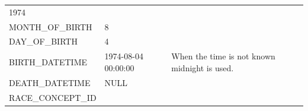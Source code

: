 \documentclass[10.5pt]{book}
\theoremstyle{definition}
\theoremstyle{definition}
\theoremstyle{definition}
\theoremstyle{remark}
\begin{document}
\begin{longtable}[]{@{}lll@{}}
\begin{minipage}[t]{0.16\columnwidth}
1974\strut
\end{minipage} & \begin{minipage}[t]{0.48\columnwidth}\raggedright\strut
\strut
\end{minipage}\tabularnewline
\begin{minipage}[t]{0.28\columnwidth}\raggedright\strut
MONTH\_OF\_BIRTH\strut
\end{minipage} & \begin{minipage}[t]{0.16\columnwidth}\raggedright\strut
8\strut
\end{minipage} & \begin{minipage}[t]{0.48\columnwidth}\raggedright\strut
\strut
\end{minipage}\tabularnewline
\begin{minipage}[t]{0.28\columnwidth}\raggedright\strut
DAY\_OF\_BIRTH\strut
\end{minipage} & \begin{minipage}[t]{0.16\columnwidth}\raggedright\strut
4\strut
\end{minipage} & \begin{minipage}[t]{0.48\columnwidth}\raggedright\strut
\strut
\end{minipage}\tabularnewline
\begin{minipage}[t]{0.28\columnwidth}\raggedright\strut
BIRTH\_DATETIME\strut
\end{minipage} & \begin{minipage}[t]{0.16\columnwidth}\raggedright\strut
1974-08-04 00:00:00\strut
\end{minipage} & \begin{minipage}[t]{0.48\columnwidth}\raggedright\strut
When the time is not known midnight is used.\strut
\end{minipage}\tabularnewline
\begin{minipage}[t]{0.28\columnwidth}\raggedright\strut
DEATH\_DATETIME\strut
\end{minipage} & \begin{minipage}[t]{0.16\columnwidth}\raggedright\strut
NULL\strut
\end{minipage} & \begin{minipage}[t]{0.48\columnwidth}\raggedright\strut
\strut
\end{minipage}\tabularnewline
\begin{minipage}[t]{0.28\columnwidth}\raggedright\strut
RACE\_CONCEPT\_ID\strut
\end{minipage} & \begin{minipage}[t]{0.16\columnwidth}\raggedright\strut

\end{minipage}
\end{longtable}
\end{document}
